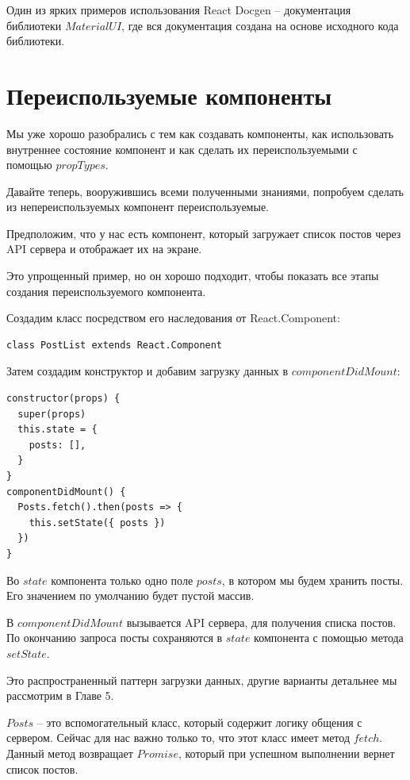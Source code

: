 Один из ярких примеров использования React Docgen -- документация библиотеки $Material UI$, где вся документация создана на основе исходного кода библиотеки.


\section{Переиспользуемые компоненты}

Мы уже хорошо разобрались с тем как создавать компоненты, как использовать внутреннее состояние компонент и как сделать их переиспользуемыми с помощью $propTypes$.

Давайте теперь, вооружившись всеми полученными знаниями, попробуем сделать из непереиспользуемых компонент переиспользуемые.

Предположим, что у нас есть компонент, который загружает список постов через API сервера и отображает их на экране.

Это упрощенный пример, но он хорошо подходит, чтобы показать все этапы создания переиспользуемого компонента.

Создадим класс посредством его наследования от React.Component:

\begin{lstlisting}
class PostList extends React.Component
\end{lstlisting}

Затем создадим конструктор и добавим загрузку данных в $componentDidMount$:

\begin{lstlisting}
constructor(props) {
  super(props)
  this.state = {
    posts: [],
  } 
}
componentDidMount() {
  Posts.fetch().then(posts => {
    this.setState({ posts })
  })
}
\end{lstlisting}

Во $state$ компонента только одно поле $posts$, в котором мы будем хранить посты. Его значением по умолчанию будет пустой массив.

В $componentDidMount$ вызывается API сервера, для получения списка постов. По окончанию запроса посты сохраняются в $state$ компонента с помощью метода $setState$.

Это распространенный паттерн загрузки данных, другие варианты детальнее мы рассмотрим в Главе 5.

$Posts$ -- это вспомогательный класс, который содержит логику общения с сервером. Сейчас для нас важно только то, что этот класс имеет метод $fetch$. Данный метод возвращает $Promise$, который при успешном выполнении вернет список постов.

